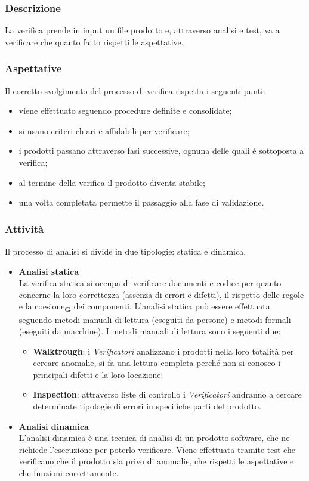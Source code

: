 \subsubsection{Descrizione}
La verifica prende in input un file prodotto e, attraverso analisi e test, va a verificare che quanto fatto rispetti le aspettative.
\subsubsection{Aspettative}
Il corretto svolgimento del processo di verifica rispetta i seguenti punti:
\begin{itemize}
    \item viene effettuato seguendo procedure definite e consolidate;
    \item si usano criteri chiari e affidabili per verificare;
    \item i prodotti passano attraverso fasi successive, ognuna delle quali è sottoposta a verifica;
    \item al termine della verifica il prodotto diventa stabile;
    \item una volta completata permette il passaggio alla fase di validazione.
\end{itemize}
\subsubsection{Attività}
Il processo di analisi si divide in due tipologie: statica e dinamica.
\begin{itemize}
    \item \textbf{Analisi statica}\\
          La verifica statica si occupa di verificare documenti e codice per quanto concerne la loro correttezza (assenza di errori e difetti), il rispetto delle regole e la coesione\textsubscript{\textbf{G}} dei componenti. L'analisi statica può essere effettuata seguendo metodi manuali di lettura (eseguiti da persone) e metodi formali (eseguiti da macchine). I metodi manuali di lettura sono i seguenti due:
          \begin{itemize}
              \item \textbf{Walktrough}: i \textit{Verificatori} analizzano i prodotti nella loro totalità per cercare anomalie, si fa una lettura completa perché non si conosco i principali difetti e la loro locazione;
              \item \textbf{Inspection}: attraverso liste di controllo i \textit{Verificatori} andranno a cercare determinate tipologie di errori in specifiche parti del prodotto.
          \end{itemize}
    \item \textbf{Analisi dinamica}\\
          L'analisi dinamica è una tecnica di analisi di un prodotto software, che ne richiede l'esecuzione per poterlo verificare. Viene effettuata tramite test che verificano che il prodotto sia privo di anomalie, che rispetti le aspettative e che funzioni correttamente.
\end{itemize}

